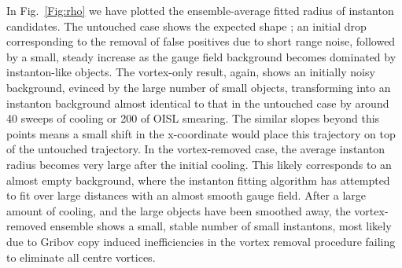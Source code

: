 \documentclass[
 reprint,
 amsmath,amssymb,
 aps,
prd,
]{revtex4-1}
\begin{document}
In Fig.~\ref{Fig:rho} we have plotted the ensemble-average fitted radius of instanton candidates. The untouched case shows the expected shape \cite{Trewartha:2013qga}; an initial drop corresponding to the removal of false positives due to short range noise, followed by a small, steady increase as the gauge field background becomes dominated by instanton-like objects. The vortex-only result, again, shows an initially noisy background, evinced by the large number of small objects, transforming into an instanton background almost identical to that in the untouched case by around 40 sweeps of cooling or 200 of OISL smearing. The similar slopes beyond this points means a small shift in the x-coordinate would place this trajectory on top of the untouched trajectory. In the vortex-removed case, the average instanton radius becomes very large after the initial cooling. This likely corresponds to an almost empty background, where the instanton fitting algorithm has attempted to fit over large distances with an almost smooth gauge field. After a large amount of cooling, and the large objects have been smoothed away, the vortex-removed ensemble shows a small, stable number of small instantons, most likely due to Gribov copy induced inefficiencies in the vortex removal procedure failing to eliminate all centre vortices. \par
\end{document}
